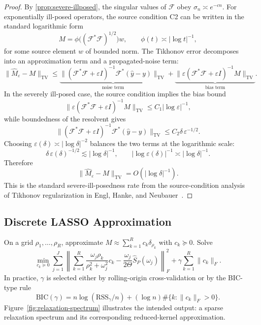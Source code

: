 \documentclass[11pt]{article}
\newcommand{\TV}{\operatorname{TV}}
\newcommand{\REV}{}
\begin{document}
\begin{proof}
\REV
By \cref{prop:severe-illposed}, the singular values of $\mathcal F$ obey $\sigma_n\asymp e^{-c n}$. For exponentially ill-posed operators, the source condition C2 can be written in the standard logarithmic form
\[
  M=\phi\!\big((\mathcal F^\ast \mathcal F)^{1/2}\big)w,
  \qquad
  \phi(t)\asymp |\log t|^{-1},
\]
for some source element $w$ of bounded norm. The Tikhonov error decomposes into an approximation term and a propagated-noise term:
\[
  \|\widehat M_\varepsilon-M\|_{\TV}
  \le
  \underbrace{\|(\mathcal F^\ast\mathcal F+\varepsilon I)^{-1}\mathcal F^\ast(\widehat y-y)\|_{\TV}}_{\text{noise term}}
  +
  \underbrace{\|\varepsilon(\mathcal F^\ast\mathcal F+\varepsilon I)^{-1}M\|_{\TV}}_{\text{bias term}}.
\]
In the severely ill-posed case, the source condition implies the bias bound
\[
  \|\varepsilon(\mathcal F^\ast\mathcal F+\varepsilon I)^{-1}M\|_{\TV}
  \le
  C_1 |\log \varepsilon|^{-1},
\]
while boundedness of the resolvent gives
\[
  \|(\mathcal F^\ast\mathcal F+\varepsilon I)^{-1}\mathcal F^\ast(\widehat y-y)\|_{\TV}
  \le
  C_2 \delta\,\varepsilon^{-1/2}.
\]
Choosing $\varepsilon(\delta)\asymp |\log\delta|^{-2}$ balances the two terms at the logarithmic scale:
\[
  \delta\,\varepsilon(\delta)^{-1/2}
  \lesssim
  |\log\delta|^{-1},
  \qquad
  |\log \varepsilon(\delta)|^{-1}\asymp |\log\delta|^{-1}.
\]
Therefore
\[
  \|\widehat M_\varepsilon-M\|_{\TV}=O(|\log\delta|^{-1}).
\]
This is the standard severe-ill-posedness rate from the source-condition analysis of Tikhonov regularization in Engl, Hanke, and Neubauer~\cite[Ch.~5]{EnglHankeNeubauer1996}.
\end{proof}

\subsection{Discrete LASSO Approximation}
On a grid $\rho_1,\dots,\rho_R$, approximate $M\approx \sum_{k=1}^R c_k\delta_{\rho_k}$ with $c_k\succeq 0$. Solve
\begin{equation}\label{eq:lasso}
  \min_{c_k\succeq 0}
  \sum_{j=1}^J
  \left\|
    \sum_{k=1}^R \frac{\omega_j\rho_k}{\rho_k^2+\omega_j^2}c_k
    -\frac{\omega_j}{2\Theta}\widehat{S}_P(\omega_j)
  \right\|_F^2
  +\gamma\sum_{k=1}^R \|c_k\|_F.
\end{equation}
In practice, $\gamma$ is selected either by rolling-origin cross-validation or by the BIC-type rule
\[
  \mathrm{BIC}(\gamma)=n\log(\mathrm{RSS}_\gamma/n)+(\log n)\#\{k:\|c_k\|_F>0\}.
\]
Figure~\ref{fig:relaxation-spectrum} illustrates the intended output: a sparse relaxation spectrum and its corresponding reduced-kernel approximation.
\end{document}
